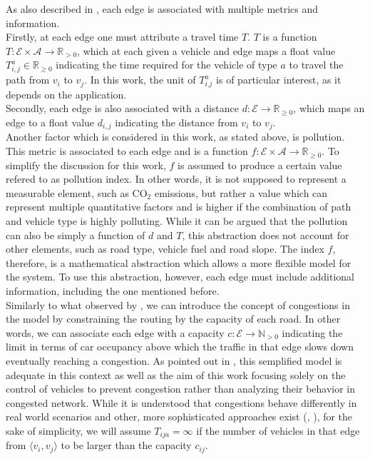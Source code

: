 As also described in \cite{project_thesis}, each edge is associated with multiple metrics and information. \\
Firstly, at each edge one must attribute a travel time $T$. $T$ is a function $T: \mathcal{E} \times \mathcal{A} \rightarrow \mathbb{R}_{> 0}$, which at each given a vehicle and edge maps a float value $T_{i,j}^a \in \mathbb{R}_{\geq 0}$ indicating the time required for the  vehicle of type $a$ to travel the path from $v_i$ to $v_j$. In this work, the unit of  $T_{i.j}^a$ is of particular interest, as it depends on the application. \\
Secondly, each edge is also associated with a distance $d: \mathcal{E} \rightarrow \mathbb{R}_{\geq 0}$, which maps an edge to a float value $d_{i,j}$ indicating the distance from $v_i$ to $v_j$. \\
Another factor which is considered in this work, as stated above, is pollution. This metric is associated to each edge and is a function 
$f: \mathcal{E} \times \mathcal{A} \rightarrow \mathbb{R}_{\geq 0}$. To simplify the discussion for this work, $f$ is assumed to produce a certain value refered to as pollution index. In other words, it is not supposed to represent a measurable element, such as $\text{CO}_2$ emissions, but rather a value which can represent multiple quantitative factors and is higher if the combination of path and vehicle type is highly polluting. While it can be argued that the pollution can also be simply a function of $d$ and $T$, this abstraction does not account for other elements, such as road type, vehicle fuel and road slope. The index $f$, therefore, is a mathematical abstraction which allows a more flexible model for the system. To use this abstraction, however, each edge must include additional information, including the one mentioned before. \\
Similarly to what observed by , we can introduce the concept of congestions in the model by constraining the routing by the capacity of each road. In other words, we can associate each edge with a capacity $c: \mathcal{E} \rightarrow \mathbb{N}_{> 0}$ indicating the limit in terms of car occupancy above which the traffic in that edge slows down eventually reaching a congestion. As pointed out in \cite{congestion_vrp_phd_graph}, this semplified model is adequate in this context as well as the aim of this work focusing solely on the control of vehicles to prevent congestion rather than analyzing their behavior in congested network. While it is understood that congestions behave differently in real world scenarios and other, more sophisticated approaches exist (\cite{lindsey1999congestion}, \cite{verhoef1999time}), for the sake of simplicity, we will assume $T_{ija} = \infty $ if the number of vehicles in that edge from  $\langle v_i, v_j \rangle$ to be larger than the capacity $c_{ij}$.\\
